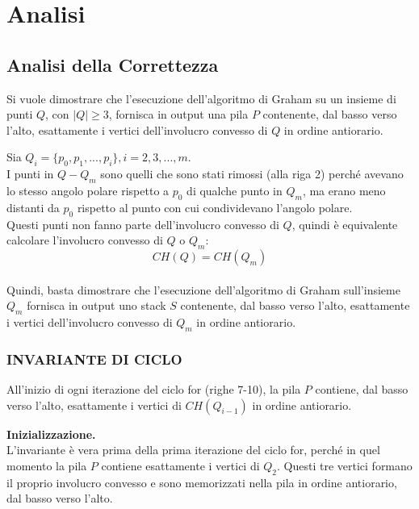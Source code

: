 \documentclass[12pt,a4paper]{report}
\begin{document}
\chapter{Analisi}\label{ch:anallisi}

\section{Analisi della Correttezza}\label{ch:correttezza}
Si vuole dimostrare che l'esecuzione dell'algoritmo di Graham su un insieme di punti $Q$, con $|Q| \geq 3$, fornisca in output una pila $P$ contenente, dal basso verso l'alto, esattamente i vertici dell'involucro convesso di $Q$ in ordine antiorario.

\vspace{0.5cm}

\noindent Sia $Q_i = \{ p_0, p_1, ..., p_i \}, i = 2, 3, ..., m$.\\
I punti in $Q - Q_m$ sono quelli che sono stati rimossi (alla riga 2) perché avevano lo stesso angolo polare rispetto a $p_0$ di qualche punto in $Q_m$, ma erano meno distanti da $p_0$ rispetto al punto con cui condividevano l'angolo polare.\\
Questi punti non fanno parte dell'involucro convesso di $Q$, quindi è equivalente calcolare l'involucro convesso di $Q$ o $Q_m$:
\[  CH(Q) = CH(Q_m) \]\\
Quindi, basta dimostrare che l'esecuzione dell'algoritmo di Graham sull'insieme $Q_m$ fornisca in output uno stack $S$ contenente, dal basso verso l'alto, esattamente i vertici dell'involucro convesso di $Q_m$ in ordine antiorario.

\subsection*{\small{INVARIANTE DI CICLO}}
All'inizio di ogni iterazione del ciclo for (righe 7-10), la pila $P$ contiene, dal basso verso l'alto, esattamente i vertici di $CH(Q_{i-1})$ in ordine antiorario.

\vspace{0.5cm}

\noindent \textbf{Inizializzazione.}\\
L'invariante è vera prima della prima iterazione del ciclo for, perché in quel momento la pila $P$ contiene esattamente i vertici di $Q_2$. Questi tre vertici formano il proprio involucro convesso e sono memorizzati nella pila in ordine antiorario, dal basso verso l'alto.
\end{document}
